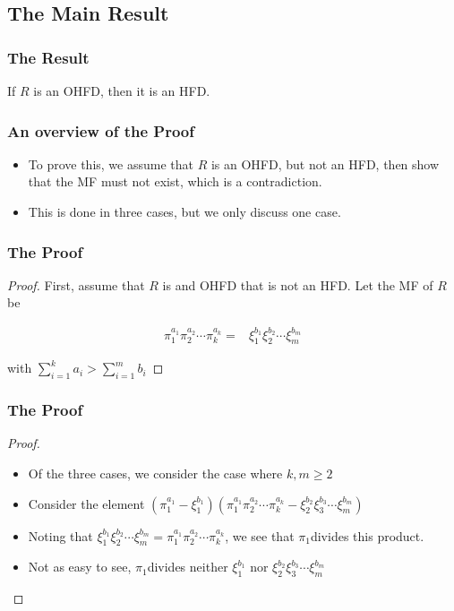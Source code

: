 \subsection{The Main Result}
\begin{frame}

	\frametitle{The Result}
	\begin{theorem}
	If $R$ is an OHFD, then it is an HFD.
	\end{theorem}
\end{frame}

\begin{frame}
  \frametitle{An overview of the Proof}
  \begin{itemize}
    \item To prove this, we assume that $R$ is an OHFD, but not an HFD, then show that the MF must not exist, which is a contradiction.
    \item This is done in three cases, but we only discuss one case.
  \end{itemize}
\end{frame}

\begin{frame}
  \frametitle{The Proof}
  \begin{proof}

  First, assume that $R$ is and OHFD that is not an HFD. Let the MF of $R$ be 

  \begin{align*}
    \pi_{1}^{a_{1}}\pi_{2}^{a_{2}}\cdots\pi_{k}^{a_{k}}= & \xi_{1}^{b_{1}}\xi_{2}^{b_{2}}\cdots\xi_{m}^{b_{m}}
  \end{align*}

  with $\sum_{i=1}^{k}a_{i}>\sum_{i=1}^{m}b_{i}$
  \noqedsymbol
  \end{proof}
\end{frame}

\begin{frame}
  \frametitle{The Proof}
  \begin{proof}
    \begin{itemize}
      \item<1-> Of the three cases, we consider the case where $k,m \geq 2$
      \item<2-> Consider the element $(\pi_{1}^{a_{1}}-\xi_{1}^{b_{1}})(\pi_{1}^{a_{1}}\pi_{2}^{a_{2}}\cdots\pi_{k}^{a_{k}}-\xi_{2}^{b_{2}}\xi_{3}^{b_{3}}\cdots\xi_{m}^{b_{m}})$
      \item<3-> Noting that $\xi_{1}^{b_{1}}\xi_{2}^{b_{2}}\cdots\xi_{m}^{b_{m}}=\pi_{1}^{a_{1}}\pi_{2}^{a_{2}}\cdots\pi_{k}^{a_{k}}$, we see that $\pi_{1}$divides this product. 
      \item<4-> Not as easy to see, $\pi_{1}$divides neither $\xi_{1}^{b_{1}}$ nor $\xi_{2}^{b_{2}}\xi_{3}^{b_{3}}\cdots\xi_{m}^{b_{m}}$
    \end{itemize}
    \noqedsymbol
  \end{proof}
\end{frame}

